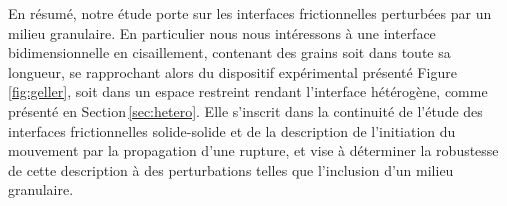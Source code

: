 En résumé, notre étude porte sur les interfaces frictionnelles perturbées par un milieu granulaire. En particulier nous nous intéressons à une interface bidimensionnelle en cisaillement, contenant des grains soit dans toute sa longueur, se rapprochant alors du dispositif expérimental présenté Figure\,\ref{fig:geller}, soit dans un espace restreint rendant l'interface hétérogène, comme présenté en Section\,\ref{sec:hetero}. Elle s'inscrit dans la continuité de l'étude des interfaces frictionnelles solide-solide et de la description de l'initiation du mouvement par la propagation d'une rupture, et vise à déterminer la robustesse de cette description à des perturbations telles que l'inclusion d'un milieu granulaire.

















